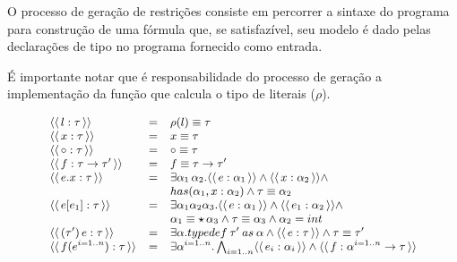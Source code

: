 \documentclass[a4paper,8pt]{article}
\newcommand{\constr}[1]{\ensuremath{\langle\langle\,#1\,\rangle\rangle}}
\begin{document}
     O processo de geração de restrições consiste em percorrer a
     sintaxe do programa para construção de uma fórmula que, se
     satisfazível, seu modelo é dado pelas declarações de tipo
     no programa fornecido como entrada. 

     É importante notar que é responsabilidade
     do processo de geração a implementação da função que calcula o
     tipo de literais ($\rho$).


     \begin{figure}[h]
       \[\small{
            \begin{array}{lcl}
                \constr{l : \tau} & = & \rho(l) \equiv \tau\\
                \constr{x : \tau} & = & x \equiv \tau \\
                \constr{\circ : \tau} & = & \circ \equiv \tau \\
                \constr{f : \tau\to \tau'} & = & f \equiv
                                                        \tau\to
                                                        \tau' \\
                \constr{e.x : \tau} & = & \exists
                                          \alpha_1\,\alpha_2. \constr{e
                                          : \alpha_1} \land \constr{x
                                          : \alpha_2} \land \\
                          & & has(\alpha_1,x:\alpha_2) \land \tau
                              \equiv \alpha_2\\
                \constr{e[e_1] : \tau} & = & \exists
                                         \alpha_1\alpha_2\alpha_3. \constr{e:\alpha_1}
                                             \land\constr{e_1: \alpha_2}\land\\
                         & & \alpha_1\equiv\star\,\alpha_3 \land \tau
                             \equiv\alpha_3 \land \alpha_2 = int\\
                \constr{(\tau')\,e:\tau} & = & \exists \alpha. typedef\:\tau'\:as\:\alpha\land\constr{e : \tau} \land
                                               \tau \equiv \tau'\\
                \constr{f(e^{i=1..n}) : \tau} & = & \exists
                                                    \alpha^{i=1..n}. \bigwedge_{i=1..n}\constr{e_i:\alpha_i}
                                                    \land \constr{f :
                                                    \alpha^{i=1..n}
                                                    \to \tau} \\

\end{array}}\]
\end{figure}
\end{document}
